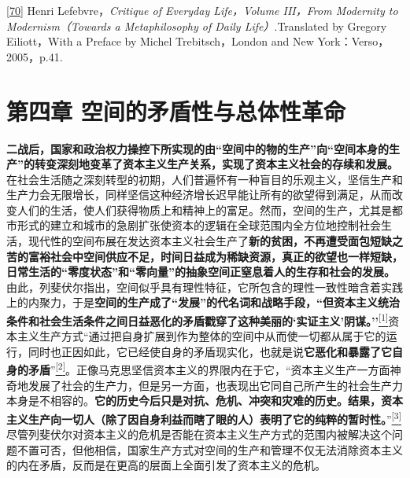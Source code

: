 \documentclass[UTF8, fontset = sourcesans, a4paper, oneside, zihao =
-4, scheme=chinese, no-math, space=true]{ctexbook}
\begin{document}
\protect\hypertarget{part0007_split_004.htmlux5cux23m70}{}{}\protect\hyperlink{part0007_split_004.htmlux5cux23w70}{{[}70{]}}
Henri Lefebvre，\emph{Critique of Everyday Life，Volume III，From
Modernity to Modernism（Towards a Metaphilosophy of Daily
Life）}.Translated by Gregory Eiliott，With a Preface by Michel
Trebitsch，London and New York：Verso，2005，p.41.

\protect\hypertarget{part0008_split_000.html}{}{}

\hypertarget{part0008_split_000.htmlux5cux23a008}{\chapter{第四章
空间的矛盾性与总体性革命}\label{part0008_split_000.htmlux5cux23a008}}

\textbf{二战后，国家和政治权力操控下所实现的由``空间中的物的生产''向``空间本身的生产''的转变深刻地变革了资本主义生产关系，实现了资本主义社会的存续和发展。}在社会生活随之深刻转型的初期，人们普遍怀有一种盲目的乐观主义，坚信生产和生产力会无限增长，同样坚信这种经济增长迟早能让所有的欲望得到满足，从而改变人们的生活，使人们获得物质上和精神上的富足。然而，空间的生产，尤其是都市形式的建立和城市的急剧扩张使资本的逻辑在全球范围内全方位地控制社会生活，现代性的空间布展在发达资本主义社会生产了\textbf{新的贫困，不再遭受面包短缺之苦的富裕社会中空间供应不足，时间日益成为稀缺资源，真正的欲望也一样短缺，日常生活的``零度状态''和``零向量''的抽象空间正窒息着人的生存和社会的发展。}由此，列斐伏尔指出，空间似乎具有理性特征，它所包含的理性一致性暗含着实践上的内聚力，于是\textbf{空间的生产成了``发展''的代名词和战略手段，``但资本主义统治条件和社会生活条件之间日益恶化的矛盾戳穿了这种美丽的`实证主义'阴谋。''}\protect\hypertarget{part0008_split_000.htmlux5cux23w1}{}{}\protect\hyperlink{part0008_split_003.htmlux5cux23m1}{\textsuperscript{{[}1{]}}}资本主义生产方式``通过把自身扩展到作为整体的空间中从而使一切都从属于它的运行，同时也正因如此，它已经使自身的矛盾现实化，也就是说\textbf{它恶化和暴露了它自身的矛盾}''\protect\hypertarget{part0008_split_000.htmlux5cux23w2}{}{}\protect\hyperlink{part0008_split_003.htmlux5cux23m2}{\textsuperscript{{[}2{]}}}。正像马克思坚信资本主义的界限内在于它，``资本主义生产一方面神奇地发展了社会的生产力，但是另一方面，也表现出它同自己所产生的社会生产力本身是不相容的。\textbf{它的历史今后只是对抗、危机、冲突和灾难的历史。结果，资本主义生产向一切人（除了因自身利益而瞎了眼的人）表明了它的纯粹的暂时性。}''\protect\hypertarget{part0008_split_000.htmlux5cux23w3}{}{}\protect\hyperlink{part0008_split_003.htmlux5cux23m3}{\textsuperscript{{[}3{]}}}尽管列斐伏尔对资本主义的危机是否能在资本主义生产方式的范围内被解决这个问题不置可否，但他相信，国家生产方式对空间的生产和管理不仅无法消除资本主义的内在矛盾，反而是在更高的层面上全面引发了资本主义的危机。
\end{document}
